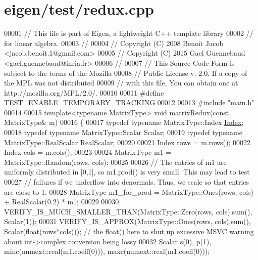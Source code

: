 \hypertarget{eigen_2test_2redux_8cpp_source}{}\section{eigen/test/redux.cpp}
\label{eigen_2test_2redux_8cpp_source}

\begin{DoxyCode}
00001 \textcolor{comment}{// This file is part of Eigen, a lightweight C++ template library}
00002 \textcolor{comment}{// for linear algebra.}
00003 \textcolor{comment}{//}
00004 \textcolor{comment}{// Copyright (C) 2008 Benoit Jacob <jacob.benoit.1@gmail.com>}
00005 \textcolor{comment}{// Copyright (C) 2015 Gael Guennebaud <gael.guennebaud@inria.fr>}
00006 \textcolor{comment}{//}
00007 \textcolor{comment}{// This Source Code Form is subject to the terms of the Mozilla}
00008 \textcolor{comment}{// Public License v. 2.0. If a copy of the MPL was not distributed}
00009 \textcolor{comment}{// with this file, You can obtain one at http://mozilla.org/MPL/2.0/.}
00010 
00011 \textcolor{preprocessor}{#define TEST\_ENABLE\_TEMPORARY\_TRACKING}
00012 
00013 \textcolor{preprocessor}{#include "main.h"}
00014 
00015 \textcolor{keyword}{template}<\textcolor{keyword}{typename} MatrixType> \textcolor{keywordtype}{void} matrixRedux(\textcolor{keyword}{const} MatrixType& m)
00016 \{
00017   \textcolor{keyword}{typedef} \textcolor{keyword}{typename} MatrixType::Index \hyperlink{namespace_eigen_a62e77e0933482dafde8fe197d9a2cfde}{Index};
00018   \textcolor{keyword}{typedef} \textcolor{keyword}{typename} MatrixType::Scalar Scalar;
00019   \textcolor{keyword}{typedef} \textcolor{keyword}{typename} MatrixType::RealScalar RealScalar;
00020 
00021   Index rows = m.rows();
00022   Index cols = m.cols();
00023 
00024   MatrixType m1 = MatrixType::Random(rows, cols);
00025 
00026   \textcolor{comment}{// The entries of m1 are uniformly distributed in [0,1], so m1.prod() is very small. This may lead to
       test}
00027   \textcolor{comment}{// failures if we underflow into denormals. Thus, we scale so that entries are close to 1.}
00028   MatrixType m1\_for\_prod = MatrixType::Ones(rows, cols) + RealScalar(0.2) * m1;
00029 
00030   VERIFY\_IS\_MUCH\_SMALLER\_THAN(MatrixType::Zero(rows, cols).sum(), Scalar(1));
00031   VERIFY\_IS\_APPROX(MatrixType::Ones(rows, cols).sum(), Scalar(\textcolor{keywordtype}{float}(rows*cols))); \textcolor{comment}{// the float() here to
       shut up excessive MSVC warning about int->complex conversion being lossy}
00032   Scalar s(0), p(1), minc(numext::real(m1.coeff(0))), maxc(numext::real(m1.coeff(0)));

\end{DoxyCode}
